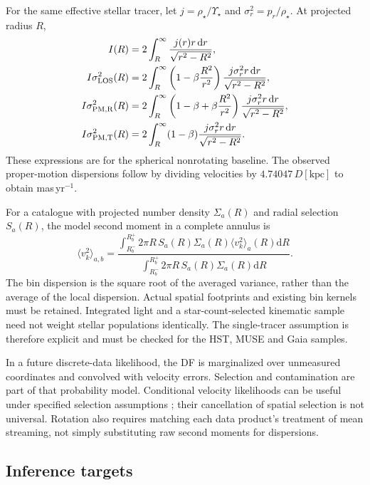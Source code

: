 \documentclass[11pt,a4paper]{article}
\newcommand{\dd}{\mathrm{d}}
\begin{document}
For the same effective stellar tracer, let $j=\rho_\star/\Upsilon_\star$ and
$\sigma_r^2=p_r/\rho_\star$. At projected radius $R$,
\begin{align}
 I(R)&=2\int_R^\infty\frac{j(r)r\,\dd r}{\sqrt{r^2-R^2}},\\
 I\sigma_{\rm LOS}^2(R)&=2\int_R^\infty
 \left(1-\beta\frac{R^2}{r^2}\right)
 \frac{j\sigma_r^2 r\,\dd r}{\sqrt{r^2-R^2}},\\
 I\sigma_{\rm PM,R}^2(R)&=2\int_R^\infty
 \left(1-\beta+\beta\frac{R^2}{r^2}\right)
 \frac{j\sigma_r^2 r\,\dd r}{\sqrt{r^2-R^2}},\\
 I\sigma_{\rm PM,T}^2(R)&=2\int_R^\infty
 (1-\beta)\frac{j\sigma_r^2 r\,\dd r}{\sqrt{r^2-R^2}}.
 \label{eq:projection}
\end{align}
These expressions are for the spherical nonrotating baseline. The observed
proper-motion dispersions follow by dividing velocities by
$4.74047\,D[\mathrm{kpc}]$ to obtain mas\,yr$^{-1}$.

For a catalogue with projected number density $\Sigma_a(R)$ and radial
selection $S_a(R)$, the model second moment in a complete annulus is
\begin{equation}
 \langle v_k^2\rangle_{a,b}=
 \frac{\int_{R_b^-}^{R_b^+}2\pi R\,S_a(R)\Sigma_a(R)
               \langle v_k^2\rangle_a(R)\dd R}
      {\int_{R_b^-}^{R_b^+}2\pi R\,S_a(R)\Sigma_a(R)\dd R}.
 \label{eq:annulus}
\end{equation}
The bin dispersion is the square root of the averaged variance, rather than
the average of the local dispersion. Actual spatial footprints and existing
bin kernels must be retained. Integrated light and a star-count-selected
kinematic sample need not weight stellar populations identically. The
single-tracer assumption is therefore explicit and must be checked for the
HST, MUSE and Gaia samples.

In a future discrete-data likelihood, the DF is marginalized over unmeasured
coordinates and convolved with velocity errors. Selection and contamination
are part of that probability model. Conditional velocity likelihoods can be
useful under specified selection assumptions
\citep{2026ApJ..1002...71V}; their cancellation of spatial selection is not
universal. Rotation also requires matching each data product's treatment of
mean streaming, not simply substituting raw second moments for dispersions.

\subsection{Inference targets}
\end{document}
